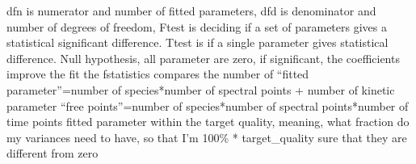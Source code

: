 \documentclass[letterpaper,10pt,english]{sphinxmanual}
\begin{document}
\begin{fulllineitems}
\label{\detokenize{plot_func:plot_func.s2_vs_smin2}}
dfn is numerator and number of fitted parameters, dfd is denominator and number of degrees of freedom,
F\sphinxhyphen{}test is deciding if a set of parameters gives a statistical significant difference. T\sphinxhyphen{}test is if a single parameter gives      statistical difference.
Null hypothesis, all parameter are zero, if significant, the coefficients improve the fit
the f\sphinxhyphen{}statistics compares the number of
“fitted parameter”=number of species*number of spectral points + number of kinetic parameter
“free points”=number of species*number of spectral points*number of time points \sphinxhyphen{} fitted parameter
within the target quality, meaning, what fraction do my variances need to have, so that I’m 100\% * target\_quality sure that they are different from zero

\end{fulllineitems}



\renewcommand{\indexname}{Python Module Index}
\begin{sphinxtheindex}
\let\bigletter\sphinxstyleindexlettergroup
\bigletter{p}
\item\relax{}
\end{sphinxtheindex}

\renewcommand{\indexname}{Index}
\printindex
\end{document}
